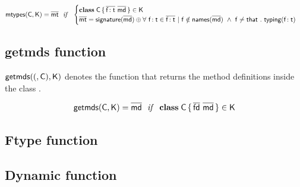 \documentclass[a4paper,USenglish]{tex/lipics-v2016}
\begin{document}
\begin{equation*}
\classoff\C\K = \b\mt ~~\mathit{if}~~ \begin{cases}

 \Class \C {\b{\Ftype\f\t}}{\b\md} \in \K\\
 \b\mt = \sign{\b\md} \oplus \forall ~\Ftype\f\t \in \b{\Ftype\f\t} ~|~ \f \notin \names{\b\md} ~\wedge~ \f\neq\that ~.~ \typez{\Ftype\f\t}

\end{cases}
\end{equation*}

\subsection{getmds function}

$\getmds(\C,\K)$ denotes the function that returns the method definitions inside the class \C.

\begin{equation*}
\getmds\C\K = \b\md ~~\mathit{if}~~ \Class\C{\b{\fd}}{\b\md} \in \K
\end{equation*}

\subsection{Ftype function}

\begin{mathpar}
\end{mathpar}


\subsection{Dynamic function}

\begin{mathpar}



\end{mathpar}
\end{document}
